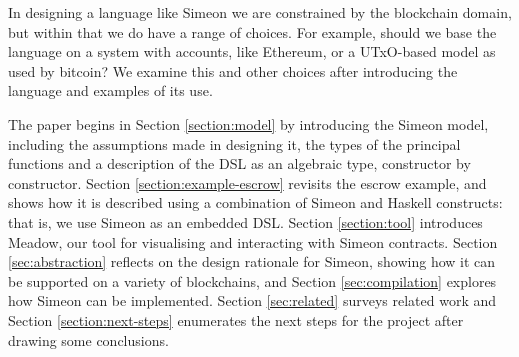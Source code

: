\documentclass[runningheads]{llncs}
\begin{document}
In designing a language like Simeon we are constrained by the blockchain domain, but within that we do have a range of 
choices. For example, should we base the language on a system with accounts, like Ethereum, or a UTxO-based model as 
used by bitcoin? We examine this and other choices after introducing the language and examples of its use. 


%
 
The paper begins in Section \ref{section:model} by introducing the Simeon 
model, including the assumptions made in designing it, the types of the principal functions and a description of the 
DSL as an algebraic type, constructor by constructor. 
Section \ref{section:example-escrow} revisits the escrow example, and shows 
how it is described using a combination of Simeon and Haskell constructs: that is, we use Simeon as an embedded DSL. 
Section \ref{section:tool} introduces Meadow, our tool for visualising and interacting with Simeon contracts.
Section \ref{sec:abstraction} reflects on the design rationale for Simeon, showing how it can be supported on a variety of 
blockchains, and Section \ref{sec:compilation} explores how Simeon can be implemented. Section \ref{sec:related} 
surveys related work and Section 
\ref{section:next-steps} enumerates the next steps for the project after drawing some conclusions.
\end{document}
